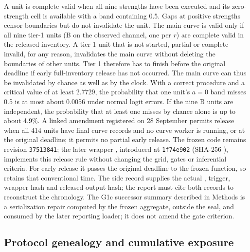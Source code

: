 A unit is complete valid when all nine strengths have been executed and its zero-strength cell is available with a band containing 0.5. Gaps at positive strengths censor boundaries but do not invalidate the unit. %
The main curve is valid only if all nine tier-1 units (B on the observed channel, one per $r$) are complete valid in the released inventory. %
A tier-1 unit that is not started, partial or complete invalid, for any reason, invalidates the main curve without deleting the boundaries of other units. Tier 1 therefore has to finish before the original deadline if early full-inventory release has not occurred. %
The main curve can thus be invalidated by chance as well as by the clock. With a correct procedure and a critical value of at least 2.7729, the probability that one unit's $a=0$ band misses 0.5 is at most about 0.0056 under normal logit errors. If the nine B units are independent, the probability that at least one misses by chance alone is up to about 4.9\%. %
A linked amendment registered on 28 September permits release when all 414 units have final curve records and no curve worker is running, or at the original deadline; it permits no partial early release. %
The frozen code remains revision \texttt{37513841}; the later wrapper , introduced at \texttt{1f74e902} (SHA-256 \allowbreak{}\allowbreak{}\allowbreak{}\allowbreak{}\allowbreak{}\allowbreak{}\allowbreak{}), implements this release rule without changing the grid, gates or inferential criteria. %
For early release it passes the original deadline to the frozen  function, so  retains that conventional time. %
The side record  supplies the actual , trigger, wrapper hash and released-output hash; the report must cite both records to reconstruct the chronology. %
The G1c successor summary described in Methods is a serialization repair computed by the frozen aggregate, outside the seal, and consumed by the later reporting loader; it does not amend the gate criterion.

\subsection*{Protocol genealogy and cumulative exposure}\label{supp:protocol-lineage}

